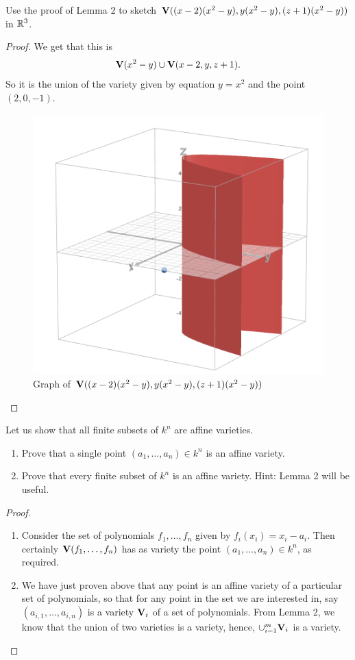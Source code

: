 \begin{exercise}{5}
Use the proof of Lemma $2$ to sketch $\mathbf{V}( (x-2)(x^2 - y), y(x^2 - y), (z+1)(x^2-y))$ in $\mathbb{R}^3$.
\end{exercise}
\begin{proof}
    We get that this is
    \begin{align*}
        \mathbf{V}(x^2 - y)\cup \mathbf{V}(x-2, y, z+1).
    \end{align*}
    So it is the union of the variety given by equation $y=x^2$ and the point $(2,0,-1)$.
    \begin{figure}
        \centering
        \includegraphics[width=0.5\linewidth]{cox-little-oshea/assets/sec1-2-ex5.png}
            \caption{Graph of $\mathbf{V}( (x-2)(x^2 - y), y(x^2 - y), (z+1)(x^2-y))$}
            \label{fig:sec1-2-ex5}
    \end{figure}
\end{proof}

\begin{exercise}{6}
Let us show that all finite subsets of $k^n$ are affine varieties.
\begin{enumerate}
    \item Prove that a single point $(a_1,\dots,a_n)\in k^n$ is an affine variety.
    \item Prove that every finite subset of $k^n$ is an affine variety. 
    Hint: Lemma 2 will be useful.
\end{enumerate}
\end{exercise}
\begin{proof}
 \begin{enumerate}
     \item Consider the set of polynomials $f_1,\dots,f_n$ given by $f_i(x_i)=x_i-a_i$. 
     Then certainly $\mathbf{V}(f_1,\dots,f_n)$ has as variety the point $(a_1,\dots,a_n)\in k^n$, as required.
     \item We have just proven above that any point is an affine variety of a particular set of polynomials, so that for any point in the set we are interested in, say $(a_{i,1},\dots,a_{i,n})$ is a variety $\mathbf{V}_i$ of a set of polynomials. 
     From Lemma 2, we know that the union of two varieties is a variety, hence, $\cup_{i=1}^{m}\mathbf{V}_i$ is a variety.
 \end{enumerate}
\end{proof}

